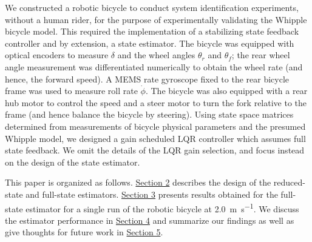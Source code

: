 \documentclass[letterpaper,11pt]{article}
\begin{document}
We constructed a robotic bicycle to conduct system identification experiments,
without a human rider, for the purpose of experimentally validating the Whipple
bicycle model. This required the implementation of a stabilizing state feedback
controller and by extension, a state estimator. The bicycle was equipped with
optical encoders to measure $\delta$ and the wheel angles $\theta_r$ and
$\theta_f$; the rear wheel angle measurement was differentiated numerically to
obtain the wheel rate (and hence, the forward speed). A MEMS rate gyroscope
fixed to the rear bicycle frame was used to measure roll rate $\dot{\phi}$. The
bicycle was also equipped with a rear hub motor to control the speed and a
steer motor to turn the fork relative to the frame (and hence balance the
bicycle by steering). Using state space matrices determined from measurements of bicycle
physical parameters and the presumed Whipple model, we designed a gain
scheduled LQR controller which assumes full state feedback. We omit the details
of the LQR gain selection, and focus instead on the design of the state
estimator.

This paper is organized as follows. \hyperref[sec:methods]{Section 2} describes
the design of the reduced-state and full-state estimators.
\hyperref[sec:results]{Section 3} presents results obtained for the full-state
estimator for a single run of the robotic bicycle at \SI{2.0}{\m\per\s}. We
discuss the estimator performance in \hyperref[sec:discussion]{Section 4} and
summarize our findings as well as give thoughts for future work in
\hyperref[sec:conclusion]{Section 5}.
\end{document}
